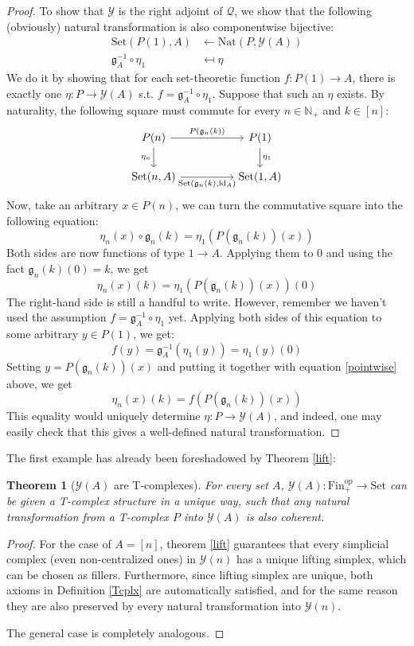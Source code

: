 \documentclass{article}
\newtheorem{theorem}{Theorem}[subsection]
\theoremstyle{remark}
\theoremstyle{definition}
\newcommand{\N}{\mathbb N}
\newcommand{\Fin}{\mathrm{Fin}}
\newcommand{\Set}{\mathrm{Set}}
\newcommand{\op}{\mathrm{op}}
\newcommand{\id}{\mathrm{id}}
\newcommand{\Y}{\mathcal Y}
\newcommand{\g}{\mathfrak g}
\newcommand{\Q}{\mathcal Q}
\newcommand{\Nat}{\mathrm{Nat}}
\begin{document}
\begin{proof}
		To show that $\Y$ is the right adjoint of $\Q$, we show that the following (obviously) natural transformation is also componentwise bijective:
		\begin{align*}
			\Set(P(1),A)&\gets\Nat(P,\Y(A))\\
			\g_A^{-1}\circ\eta_1&\mapsfrom\eta
		\end{align*}
		We do it by showing that for each set-theoretic function $f:P(1)\to A$, there is exactly one $\eta:P\to\Y(A)$ s.t. $f=\g_A^{-1}\circ\eta_1$. Suppose that such an $\eta$ exists. By naturality, the following square must commute for every $n\in\N_+$ and $k\in[n]$:
		\[\begin{tikzcd}
			P(n)\arrow{rr}{P(\g_n(k))}\arrow{d}[swap]{\eta_n}&&P(1)\arrow{d}{\eta_1}\\
			\Set(n,A)\arrow{rr}[swap]{\Set(\g_n(k),\id_A)}&&\Set(1,A)
		\end{tikzcd}\]
		Now, take an arbitrary $x\in P(n)$, we can turn the commutative square into the following equation:
		\[\eta_n(x)\circ\g_n(k)=\eta_1(P(\g_n(k))(x))\]
		Both sides are now functions of type $1\to A$. Applying them to 0 and using the fact $\g_n(k)(0)=k$, we get
		\begin{equation}\label{pointwise}
			\eta_n(x)(k)=\eta_1(P(\g_n(k))(x))(0)
		\end{equation}
		The right-hand side is still a handful to write. However, remember we haven't used the assumption $f=\g_A^{-1}\circ\eta_1$ yet. Applying both sides of this equation to some arbitrary $y\in P(1)$, we get:
		\[f(y)=\g_A^{-1}(\eta_1(y))=\eta_1(y)(0)\]
		Setting $y=P(\g_n(k))(x)$ and putting it together with equation \ref{pointwise} above, we get
		\[\eta_n(x)(k)=f(P(\g_n(k))(x))\]
		This equality would uniquely determine $\eta:P\to\Y(A)$, and indeed, one may easily check that this gives a well-defined natural transformation.
	\end{proof}
	The first example has already been foreshadowed by Theorem \ref{lift}:
	\begin{theorem}[$\Y(A)$ are T-complexes]\label{YTcplx}
		For every set $A$, $\Y(A):\Fin_+^\op\to\Set$ can be given a T-complex structure in a unique way, such that any natural transformation from a T-complex $P$ into $\Y(A)$ is also coherent.
	\end{theorem}
	\begin{proof}
		For the case of $A=[n]$, theorem \ref{lift} guarantees that every simplicial complex (even non-centralized ones) in $\Y(n)$ has a unique lifting simplex, which can be chosen as fillers. Furthermore, since lifting simplex are unique, both axioms in Definition \ref{Tcplx} are automatically satisfied, and for the same reason they are also preserved by every natural transformation into $\Y(n)$.
		
		The general case is completely analogous.
	\end{proof}
\end{document}
